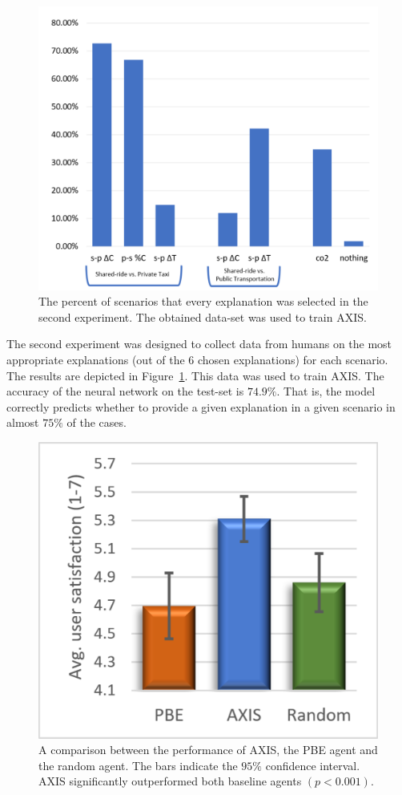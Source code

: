 \documentclass[letterpaper]{article} %
\begin{document}
\begin{figure}[hbpt]
\centering
\includegraphics[width=\columnwidth]{bar_q2.pdf}
\caption{The percent of scenarios that every explanation was selected in the second experiment. The obtained data-set was used to train AXIS.}
\label{fig:humanResults2}
\end{figure}

The second experiment was designed to collect data from humans on the most appropriate explanations (out of the $6$ chosen explanations) for each scenario. The results are depicted in Figure~\ref{fig:humanResults2}. This data was used to train AXIS.
The accuracy of the neural network on the test-set is $74.9\%$. That is, the model correctly predicts whether to provide a given explanation in a given scenario in almost $75\%$ of the cases.

\begin{figure}[hbpt]
\centering
\includegraphics[width=0.85\columnwidth]{Performance.pdf}
\caption{A comparison between the performance of AXIS, the PBE agent and the random agent. The bars indicate the $95\%$ confidence interval.
AXIS significantly outperformed both baseline agents $(p<0.001)$.}
\label{fig:humanResults3}
\end{figure}
\end{document}
